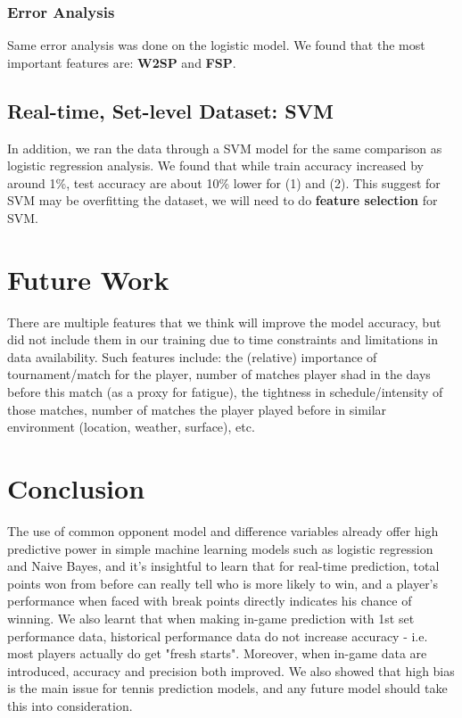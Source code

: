 \documentclass[paper=a4, fontsize=10pt]{scrartcl} %
\numberwithin{equation}{section} %
\numberwithin{figure}{section} %
\numberwithin{table}{section} %
\begin{document}
\subsubsection{Error Analysis}
Same error analysis was done on the logistic model.  We found that the most important features are: \textbf{W2SP} and \textbf{FSP}.
\subsection{Real-time, Set-level Dataset:  SVM}
In addition, we ran the data through a SVM model for the same comparison as logistic regression analysis.  We found that while train accuracy increased by around 1\%, test accuracy are about 10\%  lower for (1) and (2).  This suggest for SVM may be overfitting the dataset, we will need to do \textbf{feature selection} for SVM.

\section{Future Work}
There are multiple features that we think will improve the model accuracy, but did not include them in our training due to time constraints and limitations in data availability. Such features include: the (relative) importance of tournament/match for the player, number of matches player shad in the days before this match (as a proxy for fatigue), the tightness in schedule/intensity of those matches, number of matches the player played before in similar environment (location, weather, surface), etc.
\section{Conclusion}
The use of common opponent model and difference variables already offer high predictive power in simple machine learning models such as logistic regression and Naive Bayes, and it's insightful to learn that for real-time prediction, total points won from before can really tell who is more likely to win, and a player's performance when faced with break points directly indicates his chance of winning. We also learnt that when making in-game prediction with 1st set performance data, historical performance data do not increase accuracy - i.e. most players actually do get "fresh starts".  Moreover, when in-game data are introduced, accuracy and precision both improved. We also showed that high bias is the main issue for tennis prediction models, and any future model should take this into consideration. 
\end{document}
